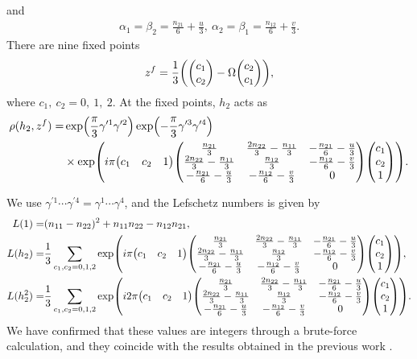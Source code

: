 \documentclass[11pt]{article}
\newcommand{\Lef}{Lefschetz }
\begin{document}
and 
\begin{align}
    \alpha_1= \beta_2= \frac{n_{21}}{6}+ \frac{u}{3},~\alpha_2= \beta_1= \frac{n_{12}}{6}+ \frac{v}{3}.
\end{align}
There are nine fixed points
\begin{align}
    z^f= \frac{1}{3} \qty( \mqty(c_1 \\c_2 ) - \Omega \mqty(c_2 \\ c_1)), 
\end{align}
where $c_1,~c_2=0,~1,~2$.
At the fixed points, $h_2$ acts as
\begin{align}
    \rho(h_2, z^f)=&  \exp(\frac{\pi}{3} \gamma^{\prime1} \gamma^{\prime2}) \exp(-\frac{\pi}{3} \gamma^{\prime3} \gamma^{\prime4}) \nonumber \\
    &\times \exp(i\pi \mqty( c_1& c_2& 1) \mqty( \frac{n_{21}}{3} &  \frac{ 2n_{22}}{3} - \frac{ n_{11}}{3} & - \frac{n_{21}}{6} -\frac{u}{3} \\
     \frac{2 n_{22}}{3} - \frac{ n_{11}}{3} & \frac{n_{12}}{3} &  - \frac{n_{12}}{6} - \frac{v}{3} \\
     -\frac{n_{21}}{6} - \frac{u}{3} &  -\frac{n_{12}}{6} - \frac{v}{3} & 0 ) \mqty(c_1 \\ c_2 \\1 )).
\end{align}


We use $\gamma^{\prime 1} \cdots\gamma^{\prime 4}= \gamma^{ 1} \cdots\gamma^{ 4}$, and the \Lef numbers is given by
\begin{align}
L(1)=& (n_{11}- n_{22})^2 + n_{11} n_{22}- n_{12}n_{21}, \\
    L(h_2)=&\frac{1}{3} \sum_{c_1, c_2=0,1,2}  \exp(i\pi \mqty( c_1& c_2& 1) \mqty( \frac{n_{21}}{3} &  \frac{ 2n_{22}}{3} - \frac{ n_{11}}{3} & - \frac{n_{21}}{6} -\frac{u}{3} \\
     \frac{2 n_{22}}{3} - \frac{ n_{11}}{3} & \frac{n_{12}}{3} &  - \frac{n_{12}}{6} - \frac{v}{3} \\
     -\frac{n_{21}}{6} - \frac{u}{3} &  -\frac{n_{12}}{6} - \frac{v}{3} & 0 ) \mqty(c_1 \\ c_2 \\1 )),\\
     L(h_2^2)=&\frac{1}{3} \sum_{c_1, c_2=0,1,2} \exp(i2\pi \mqty( c_1& c_2& 1) \mqty( \frac{n_{21}}{3} &  \frac{ 2n_{22}}{3} - \frac{ n_{11}}{3} & - \frac{n_{21}}{6} -\frac{u}{3} \\
     \frac{2 n_{22}}{3} - \frac{ n_{11}}{3} & \frac{n_{12}}{3} &  - \frac{n_{12}}{6} - \frac{v}{3} \\
     -\frac{n_{21}}{6} - \frac{u}{3} &  -\frac{n_{12}}{6} - \frac{v}{3} & 0 ) \mqty(c_1 \\ c_2 \\1 )).
\end{align}
We have confirmed that these values are integers through a brute-force calculation, and they coincide
with the results obtained in the previous work \cite{Kikuchi:2022psj}. 
\end{document}
